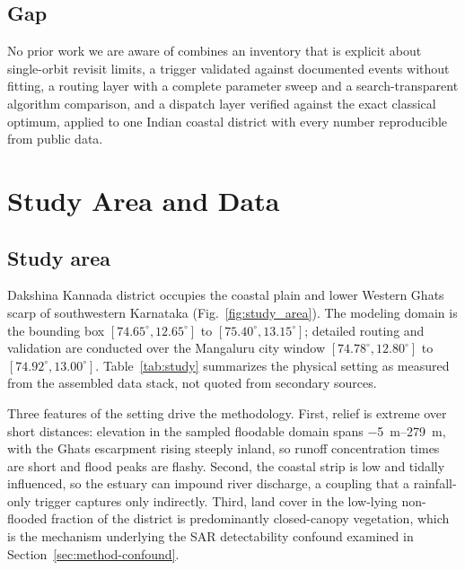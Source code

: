 \documentclass[10pt,twocolumn]{article}
\begin{document}
\subsection{Gap}
No prior work we are aware of combines an inventory that is explicit about
single-orbit revisit limits, a trigger validated against documented events
without fitting, a routing layer with a complete parameter sweep and a
search-transparent algorithm comparison, and a dispatch layer verified against
the exact classical optimum, applied to one Indian coastal district with every
number reproducible from public data.

\section{Study Area and Data}
\label{sec:study}

\subsection{Study area}
Dakshina Kannada district occupies the coastal plain and lower Western Ghats
scarp of southwestern Karnataka (Fig.~\ref{fig:study_area}). The modeling
domain is the bounding box $[74.65^\circ, 12.65^\circ]$ to
$[75.40^\circ, 13.15^\circ]$; detailed routing and validation are conducted over
the Mangaluru city window $[74.78^\circ, 12.80^\circ]$ to
$[74.92^\circ, 13.00^\circ]$. Table~\ref{tab:study} summarizes the physical
setting as measured from the assembled data stack, not quoted from
secondary sources.

Three features of the setting drive the methodology. First, relief is extreme
over short distances: elevation in the sampled floodable domain spans
\SIrange{-5}{279}{\metre}, with the Ghats escarpment rising steeply inland, so
runoff concentration times are short and flood peaks are flashy. Second, the
coastal strip is low and tidally influenced, so the estuary can impound river
discharge, a coupling that a rainfall-only trigger captures only indirectly.
Third, land cover in the low-lying non-flooded fraction of the district is
predominantly closed-canopy vegetation, which is the mechanism underlying the
SAR detectability confound examined in Section~\ref{sec:method-confound}.
\end{document}

